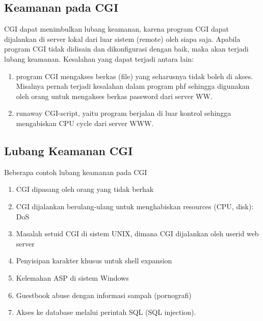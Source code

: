 \subsection{Keamanan pada CGI} 
CGI dapat menimbulkan lubang keamanan, karena program CGI dapat dijalankan di server lokal dari luar sistem (remote) oleh siapa saja. Apabila program CGI tidak didisain dan dikonfigurasi dengan baik, maka akan terjadi lubang keamanan. Kesalahan yang dapat terjadi antara lain: 
\begin{enumerate}
	\item program CGI mengakses berkas (file) yang seharusnya tidak boleh di akses. Misalnya pernah terjadi kesalahan dalam program phf sehingga digunakan oleh orang untuk mengakses berkas password dari server WW. 
	\item runaway CGI-script, yaitu program berjalan di luar kontrol sehingga mengabiskan CPU cycle dari server WWW.
\end{enumerate}

\subsection{Lubang Keamanan CGI} 
Beberapa contoh lubang keamanan pada CGI 
\begin{enumerate}
	\item CGI dipasang oleh orang yang tidak berhak 
	\item CGI dijalankan berulang-ulang untuk menghabiskan resources (CPU, disk): DoS 
	\item Masalah setuid CGI di sistem UNIX, dimana CGI dijalankan oleh userid web server 
	\item Penyisipan karakter khusus untuk shell expansion 
	\item Kelemahan ASP di sistem Windows 
	\item Guestbook abuse dengan informasi sampah (pornografi) 
	\item Akses ke database melalui perintah SQL (SQL injection).
\end {enumerate}


